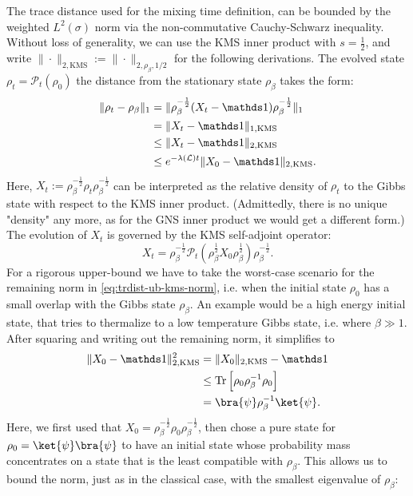 The trace distance used for the mixing time definition, can be bounded by the weighted $L^2(\sigma)$ norm via the non-commutative Cauchy-Schwarz inequality. Without loss of generality, we can use the KMS inner product with $s=\frac{1}{2}$, and write $\|\cdot\|_{2, \text{KMS}} := \|\cdot\|_{2, \rho_\beta, 1/2}$ for the following derivations. The evolved state $\rho_t = \mathcal{P}_t(\rho_0)$ the distance from the stationary state $\rho_\beta$ takes the form:
\begin{equation}
    \label{eq:trdist-ub-kms-norm}
    \begin{split}
        \|\rho_t - \rho_\beta\|_1  &= \|\rho_\beta^{-\frac{1}{2}}(X_t - \idm)\rho_\beta^{-\frac{1}{2}} \|_1 \\
        &= \|X_t - \idm\|_{1, \text{KMS}} \\
        &\leq \|X_t - \idm\|_{2, \text{KMS}} \\
        &\leq e^{-\lambda(\mathcal{L}) t} \|X_0 - \idm\|_{2, \text{KMS}}.
    \end{split}
\end{equation}
Here, $X_t := \rho_\beta^{-\frac{1}{2}} \rho_t \rho_\beta^{-\frac{1}{2}}$ can be interpreted as the relative density of $\rho_t$ to the Gibbs state with respect to the KMS inner product. (Admittedly, there is no unique "density" any more, as for the GNS inner product we would get a different form.) The evolution of $X_t$ is governed by the KMS self-adjoint operator: $$X_t = \rho_\beta^{-\frac{1}{2}}\mathcal{P}_t\left(\rho_\beta^{\frac{1}{2}} X_0 \rho_\beta^{\frac{1}{2}}\right) \rho_\beta^{-\frac{1}{2}}.$$
For a rigorous upper-bound we have to take the worst-case scenario for the remaining norm in \eqref{eq:trdist-ub-kms-norm}, i.e. when the initial state $\rho_0$ has a small overlap with the Gibbs state $\rho_\beta.$ An example would be a high energy initial state, that tries to thermalize to a low temperature Gibbs state, i.e. where $\beta \gg 1$. After squaring and writing out the remaining norm, it simplifies to
\begin{equation}
    \begin{split}
        \|X_0 - \idm\|_{2, \text{KMS}}^2 &= \| X_0 \|_{2, \text{KMS}} - \idm \\
        &\leq \tr\left[ \rho_0 \rho_\beta^{-1} \rho_0\right] \\
        &= \bra{\psi} \rho_\beta^{-1} \ket{\psi}.
    \end{split}
\end{equation}
Here, we first used that $X_0 = \rho_\beta^{-\frac{1}{2}} \rho_0 \rho_\beta^{-\frac{1}{2}}$, then chose a pure state for $\rho_0 = \ket{\psi}\bra{\psi}$ to have an initial state whose probability mass concentrates on a state that is the least compatible with $\rho_\beta$. This allows us to bound the norm, just as in the classical case, with the smallest eigenvalue of $\rho_\beta$:

